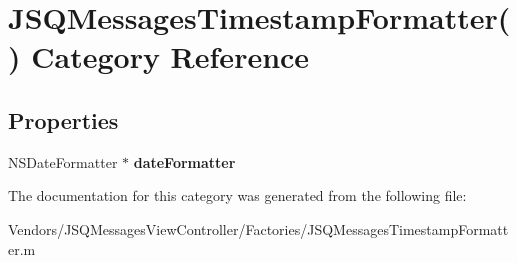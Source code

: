 \hypertarget{category_j_s_q_messages_timestamp_formatter_07_08}{}\section{J\+S\+Q\+Messages\+Timestamp\+Formatter() Category Reference}
\label{category_j_s_q_messages_timestamp_formatter_07_08}
\subsection*{Properties}
\begin{DoxyCompactItemize}
\item 
\hypertarget{category_j_s_q_messages_timestamp_formatter_07_08_aec3a59a60bc0ee647217e1f63380a175}{}N\+S\+Date\+Formatter $\ast$ {\bfseries date\+Formatter}\label{category_j_s_q_messages_timestamp_formatter_07_08_aec3a59a60bc0ee647217e1f63380a175}

\end{DoxyCompactItemize}


The documentation for this category was generated from the following file\+:\begin{DoxyCompactItemize}
\item 
Vendors/\+J\+S\+Q\+Messages\+View\+Controller/\+Factories/J\+S\+Q\+Messages\+Timestamp\+Formatter.\+m\end{DoxyCompactItemize}
